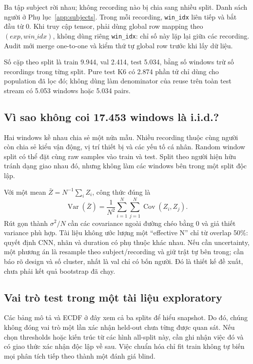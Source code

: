 \documentclass[11pt,a4paper]{article}
\newcommand{\code}[1]{{\small\ttfamily\nolinkurl{#1}}}
\theoremstyle{definition}
\begin{document}
Ba tập subject rời nhau; không recording nào bị chia sang nhiều split.
Danh sách người ở Phụ lục~\ref{app:subjects}. Trong mỗi recording,
\code{win_idx} liên tiếp và bắt đầu từ 0. Khi truy cập tensor, phải dùng
global row mapping theo $(exp,win\_idx)$, không dùng riêng \code{win_idx}:
chỉ số này lặp lại giữa các recording. Audit mới merge one-to-one và kiểm
thứ tự global row trước khi lấy dữ liệu.

Số cặp theo split là train 9.944, val 2.414, test 5.034, bằng số windows
trừ số recordings trong từng split. Pure test K6 có 2.874 phần tử chỉ dùng
cho population đã lọc đó; không dùng làm denominator của reuse trên toàn
test stream có 5.053 windows hoặc 5.034 pairs.

\subsection{Vì sao không coi 17.453 windows là i.i.d.?}
Hai windows kề nhau chia sẻ một nửa mẫu. Nhiều recording thuộc cùng người
còn chia sẻ kiểu vận động, vị trí thiết bị và các yếu tố cá nhân. Random
window split có thể đặt cùng raw samples vào train và test. Split theo
người hiện hữu tránh dạng giao nhau đó, nhưng không làm các windows bên
trong một split độc lập.

Với một mean $\bar Z=N^{-1}\sum_iZ_i$, công thức đúng là
\begin{equation}
\operatorname{Var}(\bar Z)=\frac{1}{N^2}
\sum_{i=1}^{N}\sum_{j=1}^{N}\operatorname{Cov}(Z_i,Z_j).
\end{equation}
Rút gọn thành $\sigma^2/N$ cần các covariance ngoài đường chéo bằng 0
và giả thiết variance phù hợp. Tài liệu không ước lượng một ``effective N''
chỉ từ overlap 50\%: quyết định CNN, nhãn và duration có phụ thuộc khác nhau.
Nếu cần uncertainty, một phương án là resample theo subject/recording và
giữ trật tự bên trong; cần báo rõ design và số cluster, nhất là val chỉ có
bốn người. Đó là thiết kế đề xuất, chưa phải kết quả bootstrap đã chạy.

\subsection{Vai trò test trong một tài liệu exploratory}
Các bảng mô tả và ECDF ở đây xem cả ba splits để hiểu snapshot. Do đó, chúng
không đóng vai trò một lần xác nhận held-out chưa từng được quan sát. Nếu
chọn thresholds hoặc kiến trúc từ các hình all-split này, cần ghi nhận việc
đó và có giao thức xác nhận độc lập về sau. Việc chuẩn hóa chỉ fit train
không tự biến mọi phân tích tiếp theo thành một đánh giá blind.
\end{document}
